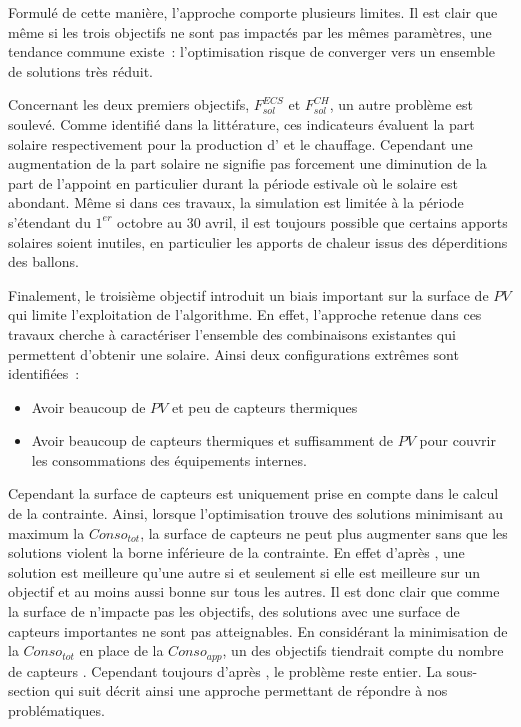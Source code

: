Formulé de cette manière, l’approche comporte plusieurs limites. Il est clair que même si
les trois objectifs ne sont pas impactés par les mêmes paramètres, une tendance commune
existe~: l’optimisation risque de converger vers un ensemble de solutions très réduit.

Concernant les deux premiers objectifs, $F_{sol}^{ECS}$ et $F_{sol}^{CH}$, un autre
problème est soulevé. Comme identifié dans la littérature, ces indicateurs évaluent la
part solaire respectivement pour la production d’ et le chauffage. Cependant une
augmentation de la part solaire ne signifie pas forcement une diminution de la part de
l’appoint en particulier durant la période estivale où le solaire est abondant. Même si
dans ces travaux, la simulation est limitée à la période s’étendant du $1^{er}$ octobre
au $30$ avril, il est toujours possible que certains apports solaires soient inutiles, en
particulier les apports de chaleur issus des déperditions des ballons.

Finalement, le troisième objectif introduit un biais important sur la surface de $PV$
qui limite l’exploitation de l’algorithme. En effet, l’approche retenue dans ces travaux
cherche à caractériser l’ensemble des combinaisons existantes qui permettent d’obtenir
une  solaire. Ainsi deux configurations extrêmes sont identifiées~:
\begin{itemize}
  \item Avoir beaucoup de $PV$ et peu de capteurs thermiques
  \item Avoir beaucoup de capteurs thermiques et suffisamment de $PV$ pour couvrir
        les consommations des équipements internes.
\end{itemize}
Cependant la surface de capteurs  est uniquement prise en compte dans le calcul de
la contrainte. Ainsi, lorsque l’optimisation trouve des solutions minimisant au maximum la
$Conso_{tot}$, la surface de capteurs  ne peut plus augmenter sans que les
solutions violent la borne inférieure de la contrainte. En effet d’après
, une solution est meilleure qu’une autre si et seulement
si elle est meilleure sur un objectif et au moins aussi bonne sur tous les autres. Il est
donc clair que comme la surface de  n’impacte pas les objectifs, des solutions
avec une surface de capteurs  importantes ne sont pas atteignables.
En considérant la minimisation de la $Conso_{tot}$ en place de la $Conso_{app}$,
un des objectifs tiendrait compte du nombre de capteurs .
Cependant toujours d’après , le problème reste entier.
La sous-section qui suit décrit ainsi une approche permettant de répondre à nos problématiques.


